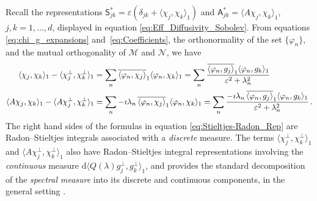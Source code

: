 \documentclass[leqno,onefignum,onetabnum]{siamltex1213}
\renewcommand{\d}{\mathrm{d}}
\newcommand{\Mc}{\mathcal{M}}
\newcommand{\Nc}{\mathcal{N}}
\newcommand{\Sm}{\mathsf{S}}
\newcommand{\Am}{\mathsf{A}}
\begin{document}
Recall the representations $\Sm^*_{jk}=\varepsilon(\delta_{jk}+\langle\chi_j,\chi_k\rangle_1)$ and
$\Am^*_{jk}=\langle A\chi_j,\chi_k\rangle_1$, $j,k=1,\ldots,d$, displayed in equation 
\eqref{eq:Eff_Diffusivity_Sobolev}. From equations
\eqref{eq:chi_g_expansions} and~\eqref{eq:Coefficients}, the
orthonormality of the set $\{\varphi_n\}$, and the mutual orthogonality of
$\Mc$ and $\Nc$, we have 
%
\begin{align}\label{eq:Stieltjes-Radon_Rep}
  \langle\chi_j,\chi_k\rangle_1-\langle\chi_j^\perp,\chi_k^\perp\rangle_1&=\sum_n\overline{\langle\varphi_n,\chi_j\rangle}_1\langle\varphi_n,\chi_k\rangle_1
         =\sum_n\frac{\overline{\langle\varphi_n,g_j\rangle}_1\langle\varphi_n,g_k\rangle_1}{\varepsilon^2+\lambda_n^2}
         \\
  \langle A\chi_j,\chi_k\rangle_1-\langle A\chi_j^\perp,\chi_k^\perp\rangle_1&=\sum_n-\imath\lambda_n\,\overline{\langle\varphi_n,\chi_j\rangle}_1\langle\varphi_n,\chi_k\rangle_1
         =\sum_n\frac{-\imath\lambda_n\,\overline{\langle\varphi_n,g_j\rangle}_1\langle\varphi_n,g_k\rangle_1}{\varepsilon^2+\lambda_n^2}\,.
         \notag
\end{align}
%
The right hand sides of the formulas in equation
\eqref{eq:Stieltjes-Radon_Rep} are Radon--Stieltjes integrals
associated with a \emph{discrete} measure. The terms $\langle\chi_j^\perp,\chi_k^\perp\rangle_1$ and
$\langle A\chi_j^\perp,\chi_k^\perp\rangle_1$ also have Radon--Stieltjes integral representations
involving the \emph{continuous} measure $\d\langle Q(\lambda)g_j^\perp,g_k^\perp\rangle_1$, and
provides the standard decomposition of the \emph{spectral measure}
into its discrete and continuous components, in the general setting
\cite{Stone:64}. 
\end{document}
